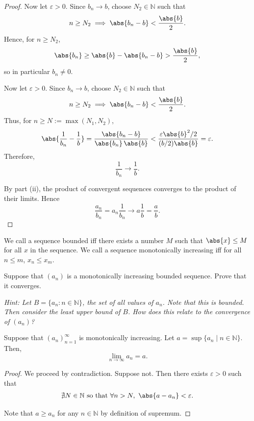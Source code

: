 \begin{exc}
\begin{solution}
\begin{proof}
			Now let $\varepsilon>0$. Since $b_n\to b$, choose $N_2\in\mathbb{N}$ such that
			\[
				n\geq N_2
				\implies
				\abs{b_n - b} < \frac{\abs{b}}{2}.
			\]
			Hence, for $n \geq N_2$,
			\[
				\abs{b_n} \geq \abs{b} - \abs{b_n - b} > \frac{\abs{b}}{2},
			\]
			so in particular $b_n \neq 0$.

			Now let $\varepsilon>0$. Since $b_n\to b$, choose $N_2\in\mathbb{N}$ such that
			\[
				n\geq N_2
				\implies
				\abs{b_n - b} < \frac{\abs{b}}{2}.
			\]
			Thus, for $n\geq N:=\max(N_1,N_2)$,
			\[
				\abs{\frac{1}{b_n}-\frac{1}{b}}
				=
				\frac{\abs{b_n-b}}{\abs{b_n}\,\abs{b}}
				<
				\frac{\varepsilon \abs{b}^2/2}{(b/2)\abs{b}}
				=
				\varepsilon.
			\]
			Therefore,
			\[
				\frac{1}{b_n}\to\frac{1}{b}.
			\]

			By part (ii), the product of convergent sequences converges to
			the product of their limits. Hence
			\[
				\frac{a_n}{b_n}
				=
				a_n\frac{1}{b_n}
				\to
				a\frac{1}{b}
				=
				\frac{a}{b}.
			\]
		\end{proof}
	\end{solution}

    \begin{exercise}
	We call a sequence bounded iff there exists a number $M$ such that $\abs{x} \leq M$ for all $x$ in the sequence.
	We call a sequence monotonically increasing iff for all $n \leq m$, $x_n \leq x_m$.

	Suppose that $(a_n)$ is a monotonically increasing bounded sequence. Prove that
	it converges.

	\emph{Hint: Let $B = \{a_n : n \in \mathbb{N}\}$, the set of all values of $a_n$. Note that this
	is bounded. Then consider the least upper bound of $B$. How does this relate to the convergence of $(a_n)$?}
	\label{exc:monotone_convergence}
	\end{exercise}
	\begin{solution}
	    Suppose that $(a_n)_{n=1}^{\infty}$ is monotonically increasing. Let
	    $a = \sup\{a_n \mid n \in \mathbb{N}\}$.
	    Then,
	    \[ \lim_{n\to\infty} a_n = a.\]

	    \begin{proof}
	    We proceed by contradiction. Suppose not. Then there exists $\varepsilon > 0$
	    such that
	    \[
	    \nexists N \in \mathbb{N} \text{ so that } \forall n > N,\ \abs{a - a_n} < \varepsilon.
	    \]

	    Note that $a \geq a_n$ for any $n \in \mathbb{N}$ by definition of supremum.


\end{proof}
\end{solution}
\end{exc}
